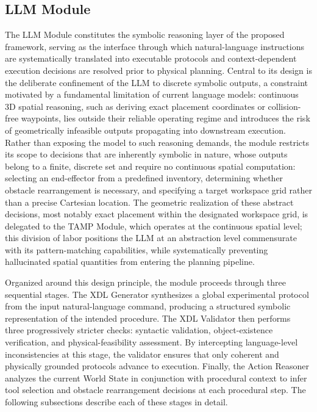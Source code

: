 \documentclass{ieeeaccess}
\begin{document}
\subsection{LLM Module}\label{sec:3.2}
The LLM Module constitutes the symbolic reasoning layer of the proposed framework, serving as the interface through which natural-language instructions are systematically translated into executable protocols and context-dependent execution decisions are resolved prior to physical planning. Central to its design is the deliberate confinement of the LLM to discrete symbolic outputs, a constraint motivated by a fundamental limitation of current language models: continuous 3D spatial reasoning, such as deriving exact placement coordinates or collision-free waypoints, lies outside their reliable operating regime and introduces the risk of geometrically infeasible outputs propagating into downstream execution. Rather than exposing the model to such reasoning demands, the module restricts its scope to decisions that are inherently symbolic in nature, whose outputs belong to a finite, discrete set and require no continuous spatial computation: selecting an end-effector from a predefined inventory, determining whether obstacle rearrangement is necessary, and specifying a target workspace grid rather than a precise Cartesian location. The geometric realization of these abstract decisions, most notably exact placement within the designated workspace grid, is delegated to the TAMP Module, which operates at the continuous spatial level; this division of labor positions the LLM at an abstraction level commensurate with its pattern-matching capabilities, while systematically preventing hallucinated spatial quantities from entering the planning pipeline.

Organized around this design principle, the module proceeds through three sequential stages. The XDL Generator synthesizes a global experimental protocol from the input natural-language command, producing a structured symbolic representation of the intended procedure. The XDL Validator then performs three progressively stricter checks: syntactic validation, object-existence verification, and physical-feasibility assessment. By intercepting language-level inconsistencies at this stage, the validator ensures that only coherent and physically grounded protocols advance to execution. Finally, the Action Reasoner analyzes the current World State in conjunction with procedural context to infer tool selection and obstacle rearrangement decisions at each procedural step. The following subsections describe each of these stages in detail.
\end{document}
